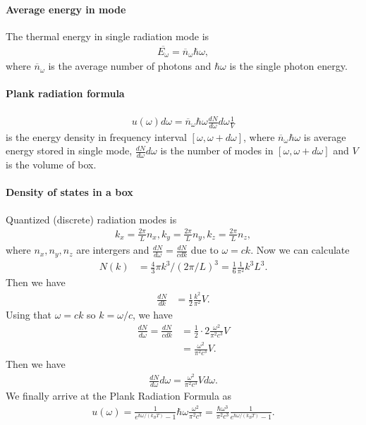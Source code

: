 \documentclass[../../note.tex]{subfiles}
\begin{document}
\paragraph*{Average energy in mode}
The thermal energy in single radiation  mode is
\begin{align}
    \overline{E_{\omega}} = \overline{n}_{\omega} \hbar \omega,
\end{align}
where $\overline{n}_{\omega}$ is the average number of photons and $\hbar \omega$ is the single photon energy. 

\paragraph*{Plank radiation formula}
\begin{align}
    u(\omega) d \omega = \overline{n}_{\omega} \hbar \omega \frac{d N}{d \omega} d \omega \frac{1}{V}
\end{align}
is the energy density in frequency interval $[\omega, \omega + d \omega]$, where $\overline{n}_{\omega} \hbar \omega$ is average energy stored in single mode, $\frac{d N }{d \omega} d \omega$ is the number of modes in $[\omega, \omega + d \omega]$ and $V$ is the volume of box.

\paragraph*{Density of states in a box}
Quantized (discrete) radiation modes is 
\begin{align}
    k_x = \frac{2 \pi}{L} n_x, k_y = \frac{2 \pi}{L} n_y, k_z = \frac{2 \pi}{L} n_z,
\end{align}
where $n_x, n_y, n_z$ are intergers and $\frac{d N}{d \omega} = \frac{d N}{c d k}$ due to $\omega = ck$. Now we can calculate 
\begin{align}
    N(k)
    &= \frac{4}{3} \pi k^3/(2 \pi/L)^3 =\frac{1}{6} \frac{1}{ \pi^2} k^3 L^3.
\end{align}
Then we have
\begin{align}
    \frac{dN}{dk} 
    &= \frac{1}{2} \frac{k^2}{\pi^2} V.
\end{align} 
Using that $\omega = ck$ so $k = \omega/c$, we have
\begin{align}
    \frac{dN}{d \omega} = \frac{dN}{c dk} 
    &= \frac{1}{2} \cdot 2 \frac{\omega^2}{\pi^2 c^3} V \\
    &= \frac{\omega^2}{\pi^2 c^3} V.
\end{align}
Then we have
\begin{align}
    \frac{dN}{d \omega} d \omega = \frac{\omega^2}{\pi^2 c^3} V d \omega.
\end{align}
We finally arrive at the Plank Radiation Formula as
\begin{align}
    u(\omega) = \frac{1}{e^{\hbar \omega / (k_B T)} - 1} \hbar \omega \frac{\omega^2}{\pi^2 c^3} = \frac{\hbar \omega^3}{\pi^2 c^3} \frac{1}{e^{\hbar \omega / (k_B T)} - 1}.
\end{align}
\end{document}
